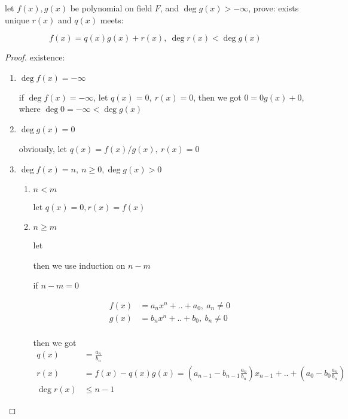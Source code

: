 \begin{exercise}
    let $f(x), g(x)$ be polynomial on field $F$, and $\deg g(x) > -\infty$, prove: exists unique $r(x)$ and $q(x)$ meets:

    \[
        f(x) = q(x)g(x) + r(x),\: \deg r(x) < \deg g(x)
    \]

\end{exercise}

\begin{proof}
existence:

    \begin{enumerate}
        \item $\deg f(x) = -\infty$

        if $\deg f(x) = -\infty$, let $q(x) = 0,\: r(x) = 0$, then we got $0 = 0 g(x) + 0$, where $\deg 0 = -\infty < \deg g(x)$

        \item $\deg g(x) = 0$

        obviously, let $q(x) = f(x)/g(x),\: r(x) = 0$

        \item $\deg f(x) = n,\: n \ge 0, \deg g(x) > 0$

        \begin{enumerate}
            \item $n < m$

            let $q(x) = 0, r(x) = f(x)$

            \item $n \ge m$

            let 


            then we use induction on $n-m$

            if $n-m = 0$

            \begin{align*}
                f(x) &= a_nx^n + .. + a_0,\: a_n \ne 0 \\
                g(x) &= b_nx^n + .. + b_0,\: b_n \ne 0 \\
            \end{align*}

            then we got 
            \begin{align*}
                q(x) &= \frac{a_n}{b_n} \\
                r(x) &= f(x) - q(x)g(x) = (a_{n-1}-b_{n-1}\frac{a_n}{b_n})x_{n-1} + .. + (a_{0}-b_{0}\frac{a_n}{b_n}) \\
                \deg r(x) & \le n-1
            \end{align*}


\end{enumerate}
\end{enumerate}
\end{proof}
